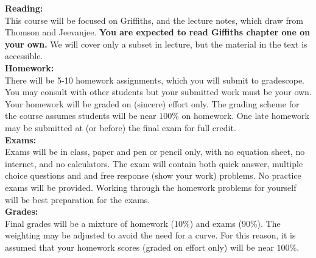 \documentclass[12pt]{article}
\begin{document}
\newpage

\noindent
\textbf{Reading:}\\ This course will be focused on Griffiths, and the
lecture notes, which draw from Thomson and Jeevanjee.  {\bf You are
  expected to read Giffiths chapter one on your own.}  We will cover
only a subset in lecture, but the material in the text is
accessible.\\[3pt]

\noindent
\textbf{Homework:}\\ There will be 5-10 homework assignments, which
you will submit to gradescope.  You may consult with other students
but your submitted work must be your own.  Your homework will be
graded on (sincere) effort only.  The grading scheme for the course
assumes students will be near $100\%$ on homework.  One late homework
may be submitted at (or before) the final exam for full credit.\\[3pt]


\noindent
\textbf{Exams:}\\ Exams will be in class, paper and pen or pencil
only, with no equation sheet, no internet, and no calculators.  The
exam will contain both quick answer, multiple choice questions and and
free response (show your work) problems.  No practice exams will be
provided.  Working through the homework problems for yourself will be
best preparation for the exams.\\[3pt]

\noindent
\textbf {Grades:}\\ Final grades will be a mixture of homework (10\%)
and exams (90\%).  The weighting may be adjusted to avoid the need for
a curve.  For this reason, it is assumed that your homework scores
(graded on effort only) will be near $100\%$.\\
\end{document}
